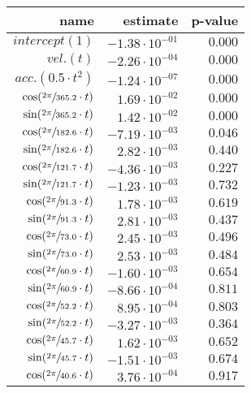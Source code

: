 \begin{tabular}{r|rr}
\hline
 name                                & estimate               & p-value   \\
\hline
 $intercept (1)$                     & $-1.38 \cdot 10^{-01}$ & $0.000$   \\
 $vel. (t)$                          & $-2.26 \cdot 10^{-04}$ & $0.000$   \\
 $acc. (0.5 \cdot t^2)$              & $-1.24 \cdot 10^{-07}$ & $0.000$   \\
 $\cos(\sfrac{2\pi}{365.2} \cdot t)$ & $1.69 \cdot 10^{-02}$  & $0.000$   \\
 $\sin(\sfrac{2\pi}{365.2} \cdot t)$ & $1.42 \cdot 10^{-02}$  & $0.000$   \\
 $\cos(\sfrac{2\pi}{182.6} \cdot t)$ & $-7.19 \cdot 10^{-03}$ & $0.046$   \\
 $\sin(\sfrac{2\pi}{182.6} \cdot t)$ & $2.82 \cdot 10^{-03}$  & $0.440$   \\
 $\cos(\sfrac{2\pi}{121.7} \cdot t)$ & $-4.36 \cdot 10^{-03}$ & $0.227$   \\
 $\sin(\sfrac{2\pi}{121.7} \cdot t)$ & $-1.23 \cdot 10^{-03}$ & $0.732$   \\
 $\cos(\sfrac{2\pi}{91.3} \cdot t)$  & $1.78 \cdot 10^{-03}$  & $0.619$   \\
 $\sin(\sfrac{2\pi}{91.3} \cdot t)$  & $2.81 \cdot 10^{-03}$  & $0.437$   \\
 $\cos(\sfrac{2\pi}{73.0} \cdot t)$  & $2.45 \cdot 10^{-03}$  & $0.496$   \\
 $\sin(\sfrac{2\pi}{73.0} \cdot t)$  & $2.53 \cdot 10^{-03}$  & $0.484$   \\
 $\cos(\sfrac{2\pi}{60.9} \cdot t)$  & $-1.60 \cdot 10^{-03}$ & $0.654$   \\
 $\sin(\sfrac{2\pi}{60.9} \cdot t)$  & $-8.66 \cdot 10^{-04}$ & $0.811$   \\
 $\cos(\sfrac{2\pi}{52.2} \cdot t)$  & $8.95 \cdot 10^{-04}$  & $0.803$   \\
 $\sin(\sfrac{2\pi}{52.2} \cdot t)$  & $-3.27 \cdot 10^{-03}$ & $0.364$   \\
 $\cos(\sfrac{2\pi}{45.7} \cdot t)$  & $1.62 \cdot 10^{-03}$  & $0.652$   \\
 $\sin(\sfrac{2\pi}{45.7} \cdot t)$  & $-1.51 \cdot 10^{-03}$ & $0.674$   \\
 $\cos(\sfrac{2\pi}{40.6} \cdot t)$  & $3.76 \cdot 10^{-04}$  & $0.917$   \\
\hline
\end{tabular}\hspace{1cm}\begin{tabular}{r|rr}

\end{tabular}
